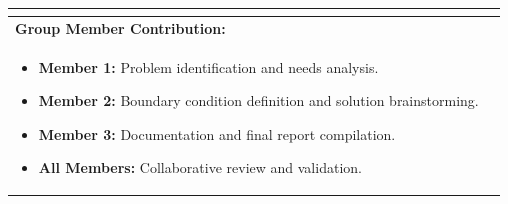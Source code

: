\documentclass{article}
\begin{document}
\begin{table}[h!]
\begin{tabularx}{\textwidth}{|X|X|}
\begin{itemize}
\end{itemize} \\ \hline
\textbf{Group Member Contribution:} & \\ \hline
\begin{itemize}
    \item \textbf{Member 1:} Problem identification and needs analysis.
    \item \textbf{Member 2:} Boundary condition definition and solution brainstorming.
    \item \textbf{Member 3:} Documentation and final report compilation.
    \item \textbf{All Members:} Collaborative review and validation.
\end{itemize} & 
\\ \hline
\end{tabularx}
\end{table}
\end{document}
